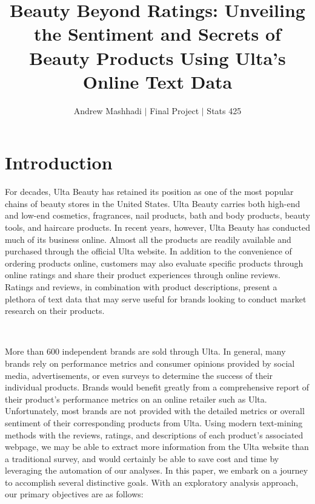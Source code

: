\documentclass[10pt]{article}
\title{\vspace{-1cm}Beauty Beyond Ratings: Unveiling the Sentiment and Secrets of Beauty Products Using Ulta's Online Text Data}
\author{Andrew Mashhadi $\vert$ Final Project $\vert$ Stats 425}
\date{}
\begin{document}
\maketitle

\section{Introduction}

For decades, Ulta Beauty has retained its position as one of the most popular chains of beauty stores in the United States. Ulta Beauty carries both high-end and low-end cosmetics, fragrances, nail products, bath and body products, beauty tools, and haircare products. In recent years, however, Ulta Beauty has conducted much of its business online. Almost all the products are readily available and purchased through the official Ulta website. In addition to the convenience of ordering products online, customers may also evaluate specific products through online ratings and share their product experiences through online reviews. Ratings and reviews, in combination with product descriptions, present a plethora of text data that may serve useful for brands looking to conduct market research on their products.  

\

More than 600 independent brands are sold through Ulta. In general, many brands rely on performance metrics and consumer opinions provided by social media, advertisements, or even surveys to determine the success of their individual products. Brands would benefit greatly from a comprehensive report of their product's performance metrics on an online retailer such as Ulta. Unfortunately, most brands are not provided with the detailed metrics or overall sentiment of their corresponding products from Ulta. Using modern text-mining methods with the reviews, ratings, and descriptions of each product's associated webpage, we may be able to extract more information from the Ulta website than a traditional survey, and would certainly be able to save cost and time by leveraging the automation of our analyses. In this paper, we embark on a journey to accomplish several distinctive goals. With an exploratory analysis approach, our primary objectives are as follows:
\end{document}
